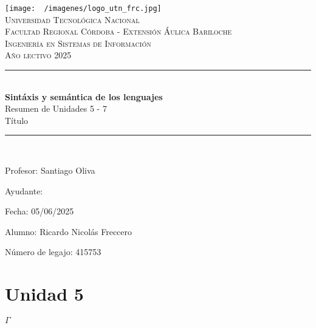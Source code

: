 \documentclass[12pt]{article}
\begin{document}
  \begin{titlepage}
    \centering
    \texttt{[image: ~/imagenes/logo\_utn\_frc.jpg]}\\

    \textsc{
      \LARGE Universidad Tecnológica Nacional\\
      \Large Facultad Regional Córdoba - Extensión Áulica Bariloche\\
      \large Ingeniería en Sistemas de Información\\
      Año lectivo 2025\\[0.5cm]
    }

    \rule{\linewidth}{1.0mm}\\[0.4cm]
    \Huge
    \textbf{Sintáxis y semántica de los lenguajes}\\
    Resumen de Unidades 5 - 7\\[0.2cm]
    \LARGE
    Título
    \rule{\linewidth}{1.0mm}\\
    \large
    \begin{flushleft}
      Profesor: Santiago Oliva

      Ayudante: 

      Fecha: 05/06/2025
    \end{flushleft}

    \vfill
    \begin{flushright}
      Alumno: Ricardo Nicolás Freccero

      Número de legajo: 415753
    \end{flushright}
  \end{titlepage}

  \restoregeometry
  \tableofcontents
  \newpage

  \section{Unidad 5}
  $ \Gamma $
  


\end{document}
